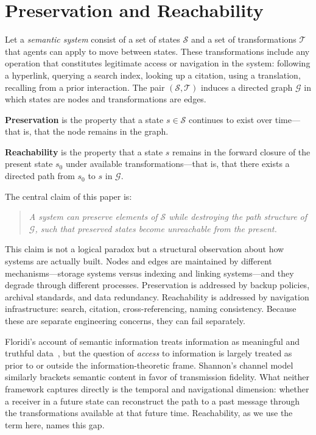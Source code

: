 \documentclass[12pt]{article}
\newcommand{\sS}{\mathcal{S}}
\newcommand{\sT}{\mathcal{T}}
\newcommand{\sG}{\mathcal{G}}
\begin{document}
\section{Preservation and Reachability}

Let a \emph{semantic system} consist of a set of states $\sS$ and a set of
transformations $\sT$ that agents can apply to move between states.
These transformations include any operation that constitutes legitimate access or
navigation in the system: following a hyperlink, querying a search index, looking
up a citation, using a translation, recalling from a prior interaction.
The pair $(\sS, \sT)$ induces a directed graph $\sG$ in which states are nodes
and transformations are edges.

\textbf{Preservation} is the property that a state $s \in \sS$ continues to
exist over time---that is, that the node remains in the graph.

\textbf{Reachability} is the property that a state $s$ remains in the forward
closure of the present state $s_0$ under available transformations---that is,
that there exists a directed path from $s_0$ to $s$ in $\sG$.

The central claim of this paper is:

\begin{quote}
\textit{A system can preserve elements of $\sS$ while destroying the path
structure of $\sG$, such that preserved states become unreachable from the
present.}
\end{quote}

This claim is not a logical paradox but a structural observation about how
systems are actually built.
Nodes and edges are maintained by different mechanisms---storage systems versus
indexing and linking systems---and they degrade through different processes.
Preservation is addressed by backup policies, archival standards, and data
redundancy.
Reachability is addressed by navigation infrastructure: search, citation,
cross-referencing, naming consistency.
Because these are separate engineering concerns, they can fail separately.

Floridi's account of semantic information treats information as meaningful and
truthful data~\cite{floridi2011}, but the question of \emph{access} to
information is largely treated as prior to or outside the information-theoretic
frame.
Shannon's channel model~\cite{shannon1948} similarly brackets semantic content
in favor of transmission fidelity.
What neither framework captures directly is the temporal and navigational
dimension: whether a receiver in a future state can reconstruct the path to a
past message through the transformations available at that future time.
Reachability, as we use the term here, names this gap.
\end{document}
